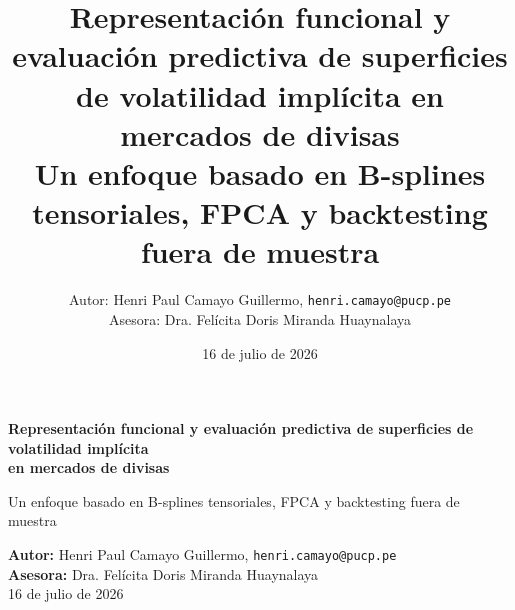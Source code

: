\documentclass[a4paper,11pt]{article}
\title{\textbf{Representación funcional y evaluación predictiva de superficies de volatilidad implícita en mercados de divisas}\\
\large Un enfoque basado en B-splines tensoriales, FPCA y backtesting fuera de muestra}
\author{Autor: Henri Paul Camayo Guillermo, \texttt{henri.camayo@pucp.pe}\\
Asesora: Dra. Felícita Doris Miranda Huaynalaya}
\date{16 de julio de 2026}
\begin{document}
\begin{titlepage}
  \centering
  \vspace*{\fill}
  {\Large\bfseries
    Representación funcional y evaluación predictiva de superficies de volatilidad implícita\\
    en mercados de divisas\par}
  \vspace{0.75cm}
  {\large Un enfoque basado en B-splines tensoriales, FPCA y backtesting fuera de muestra\par}
  \vspace{1.5cm}
  \normalsize
  \textbf{Autor:} Henri Paul Camayo Guillermo, \texttt{henri.camayo@pucp.pe}\\
  \textbf{Asesora:} Dra. Felícita Doris Miranda Huaynalaya\\
  \vspace{1.5cm}
  16 de julio de 2026
  \vspace*{\fill}
\end{titlepage}
\end{document}
